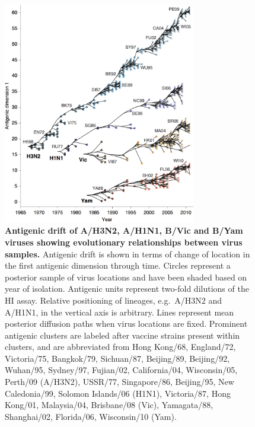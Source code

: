 \documentclass[11pt,oneside,letterpaper]{article}
\begin{document}
\begin{figure}[h]
	\centering		
	\includegraphics[width=0.75\textwidth]{figures/drift}
	\caption{\textbf{Antigenic drift of A/H3N2, A/H1N1, B/Vic and B/Yam viruses showing evolutionary relationships between virus samples.} 
	Antigenic drift is shown in terms of change of location in the first antigenic dimension through time.
	Circles represent a posterior sample of virus locations and have been shaded based on year of isolation.
	Antigenic units represent two-fold dilutions of the HI assay.
	Relative positioning of lineages, e.g.\ A/H3N2 and A/H1N1, in the vertical axis is arbitrary.
	Lines represent mean posterior diffusion paths when virus locations are fixed.
	Prominent antigenic clusters are labeled after vaccine strains present within clusters, and are abbreviated from Hong Kong/68, England/72, Victoria/75, Bangkok/79, Sichuan/87, Beijing/89, Beijing/92, Wuhan/95, Sydney/97, Fujian/02, California/04, Wisconsin/05, Perth/09 (A/H3N2), USSR/77, Singapore/86, Beijing/95, New Caledonia/99, Solomon Islands/06 (H1N1), Victoria/87, Hong Kong/01, Malaysia/04, Brisbane/08 (Vic), Yamagata/88, Shanghai/02, Florida/06, Wisconsin/10 (Yam).} 
	\label{drift} 
\end{figure}
\end{document}
